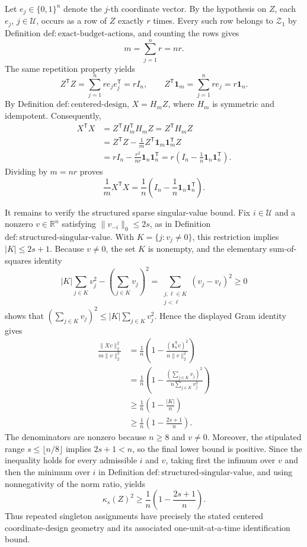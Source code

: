 Let \(e_j\in\{0,1\}^n\) denote the \(j\)-th coordinate vector.  By the hypothesis on \(Z\), each \(e_j\), \(j\in\mathcal U\), occurs as a row of \(Z\) exactly \(r\) times.  Every such row belongs to \(\mathcal Z_1\) by Definition \(\mathrm{def{:}exact\mbox{-}budget\mbox{-}actions}\), and counting the rows gives
\[
m=\sum_{j=1}^n r=nr.
\]
The same repetition property yields
\[
Z^{\mathsf T}Z=\sum_{j=1}^n r e_je_j^{\mathsf T}=rI_n,
\qquad
Z^{\mathsf T}\mathbf 1_m=\sum_{j=1}^n r e_j=r\mathbf 1_n.
\]
By Definition \(\mathrm{def{:}centered\mbox{-}design}\), \(X=H_mZ\), where \(H_m\) is symmetric and idempotent.  Consequently,
\[
\begin{aligned}
X^{\mathsf T}X
&=Z^{\mathsf T}H_m^{\mathsf T}H_mZ
=Z^{\mathsf T}H_mZ\\
&=Z^{\mathsf T}Z-\frac{1}{m}Z^{\mathsf T}\mathbf 1_m\mathbf 1_m^{\mathsf T}Z\\
&=rI_n-\frac{r^2}{nr}\mathbf 1_n\mathbf 1_n^{\mathsf T}
=r\left(I_n-\frac{1}{n}\mathbf 1_n\mathbf 1_n^{\mathsf T}\right).
\end{aligned}
\]
Dividing by \(m=nr\) proves
\[
\frac{1}{m}X^{\mathsf T}X
=\frac{1}{n}\left(I_n-\frac{1}{n}\mathbf 1_n\mathbf 1_n^{\mathsf T}\right).
\]

It remains to verify the structured sparse singular-value bound.  Fix \(i\in\mathcal U\) and a nonzero \(v\in\mathbb R^n\) satisfying \(\lVert v_{-i}\rVert_0\le 2s\), as in Definition \(\mathrm{def{:}structured\mbox{-}singular\mbox{-}value}\).  With \(K=\{j:v_j\ne0\}\), this restriction implies \(\lvert K\rvert\le 2s+1\).  Because \(v\ne0\), the set \(K\) is nonempty, and the elementary sum-of-squares identity
\[
\lvert K\rvert\sum_{j\in K}v_j^2-\left(\sum_{j\in K}v_j\right)^2
=\sum_{\substack{j,\ell\in K\\j<\ell}}(v_j-v_\ell)^2
\ge0
\]
shows that \(\left(\sum_{j\in K}v_j\right)^2\le\lvert K\rvert\sum_{j\in K}v_j^2\).  Hence the displayed Gram identity gives
\[
\begin{aligned}
\frac{\lVert Xv\rVert_2^2}{m\lVert v\rVert_2^2}
&=\frac{1}{n}\left(1-\frac{(\mathbf 1_n^{\mathsf T}v)^2}{n\lVert v\rVert_2^2}\right)\\
&=\frac{1}{n}\left(1-\frac{\left(\sum_{j\in K}v_j\right)^2}{n\sum_{j\in K}v_j^2}\right)\\
&\ge \frac{1}{n}\left(1-\frac{\lvert K\rvert}{n}\right)\\
&\ge \frac{1}{n}\left(1-\frac{2s+1}{n}\right).
\end{aligned}
\]
The denominators are nonzero because \(n\ge8\) and \(v\ne0\).  Moreover, the stipulated range \(s\le\lfloor n/8\rfloor\) implies \(2s+1<n\), so the final lower bound is positive.  Since the inequality holds for every admissible \(i\) and \(v\), taking first the infimum over \(v\) and then the minimum over \(i\) in Definition \(\mathrm{def{:}structured\mbox{-}singular\mbox{-}value}\), and using nonnegativity of the norm ratio, yields
\[
\kappa_s(Z)^2\ge \frac{1}{n}\left(1-\frac{2s+1}{n}\right).
\]
Thus repeated singleton assignments have precisely the stated centered coordinate-design geometry and its associated one-unit-at-a-time identification bound.